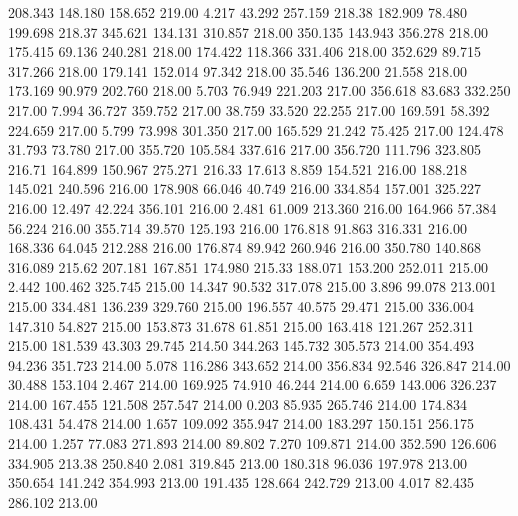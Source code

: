  208.343  148.180  158.652       219.00
   4.217   43.292  257.159       218.38
 182.909   78.480  199.698       218.37
 345.621  134.131  310.857       218.00
 350.135  143.943  356.278       218.00
 175.415   69.136  240.281       218.00
 174.422  118.366  331.406       218.00
 352.629   89.715  317.266       218.00
 179.141  152.014   97.342       218.00
  35.546  136.200   21.558       218.00
 173.169   90.979  202.760       218.00
   5.703   76.949  221.203       217.00
 356.618   83.683  332.250       217.00
   7.994   36.727  359.752       217.00
  38.759   33.520   22.255       217.00
 169.591   58.392  224.659       217.00
   5.799   73.998  301.350       217.00
 165.529   21.242   75.425       217.00
 124.478   31.793   73.780       217.00
 355.720  105.584  337.616       217.00
 356.720  111.796  323.805       216.71
 164.899  150.967  275.271       216.33
  17.613    8.859  154.521       216.00
 188.218  145.021  240.596       216.00
 178.908   66.046   40.749       216.00
 334.854  157.001  325.227       216.00
  12.497   42.224  356.101       216.00
   2.481   61.009  213.360       216.00
 164.966   57.384   56.224       216.00
 355.714   39.570  125.193       216.00
 176.818   91.863  316.331       216.00
 168.336   64.045  212.288       216.00
 176.874   89.942  260.946       216.00
 350.780  140.868  316.089       215.62
 207.181  167.851  174.980       215.33
 188.071  153.200  252.011       215.00
   2.442  100.462  325.745       215.00
  14.347   90.532  317.078       215.00
   3.896   99.078  213.001       215.00
 334.481  136.239  329.760       215.00
 196.557   40.575   29.471       215.00
 336.004  147.310   54.827       215.00
 153.873   31.678   61.851       215.00
 163.418  121.267  252.311       215.00
 181.539   43.303   29.745       214.50
 344.263  145.732  305.573       214.00
 354.493   94.236  351.723       214.00
   5.078  116.286  343.652       214.00
 356.834   92.546  326.847       214.00
  30.488  153.104    2.467       214.00
 169.925   74.910   46.244       214.00
   6.659  143.006  326.237       214.00
 167.455  121.508  257.547       214.00
   0.203   85.935  265.746       214.00
 174.834  108.431   54.478       214.00
   1.657  109.092  355.947       214.00
 183.297  150.151  256.175       214.00
   1.257   77.083  271.893       214.00
  89.802    7.270  109.871       214.00
 352.590  126.606  334.905       213.38
 250.840    2.081  319.845       213.00
 180.318   96.036  197.978       213.00
 350.654  141.242  354.993       213.00
 191.435  128.664  242.729       213.00
   4.017   82.435  286.102       213.00
